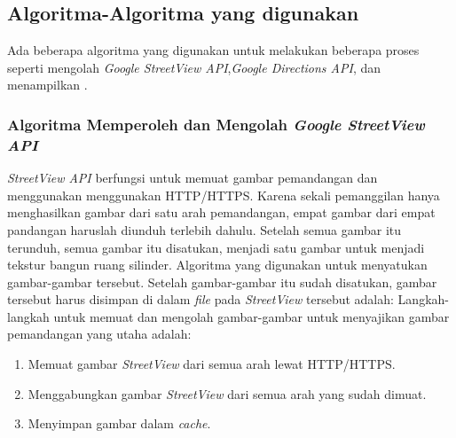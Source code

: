 \subsection{Algoritma-Algoritma yang digunakan}
Ada beberapa algoritma yang digunakan   untuk melakukan beberapa proses seperti mengolah \textit{Google StreetView API},\textit{Google Directions API}, dan menampilkan .

\subsubsection{Algoritma Memperoleh dan Mengolah \textit{Google StreetView API}} 
\textit{StreetView API} berfungsi untuk memuat gambar pemandangan dan menggunakan menggunakan HTTP/HTTPS. Karena sekali pemanggilan hanya menghasilkan gambar dari satu arah pemandangan, empat gambar dari empat pandangan haruslah diunduh terlebih dahulu. Setelah semua gambar itu terunduh, semua gambar itu disatukan, menjadi satu gambar untuk menjadi tekstur bangun ruang silinder. Algoritma yang digunakan untuk menyatukan gambar-gambar tersebut. Setelah gambar-gambar itu sudah disatukan, gambar tersebut harus disimpan di dalam \textit{file} pada \textit{StreetView} tersebut adalah: Langkah-langkah untuk memuat dan mengolah gambar-gambar untuk menyajikan gambar pemandangan yang utaha adalah:

	\begin{enumerate}
		\item Memuat gambar \textit{StreetView} dari semua arah lewat HTTP/HTTPS. 
		
		\item Menggabungkan gambar  \textit{StreetView} dari semua arah yang sudah dimuat.
		
		\item Menyimpan gambar dalam \textit{cache}.
	\end{enumerate}	
	
